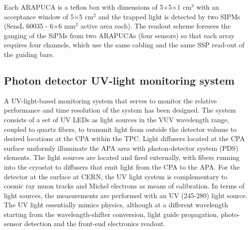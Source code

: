 Each ARAPUCA is a teflon box with dimensions of 5$\times$5$\times$1 cm$^3$ with an acceptance window of 5$\times$5 
cm$^2$ and the trapped light is detected by two SIPMs (SensL 60035 - 6$\times$6 mm$^2$ active area each). The readout scheme foresees the ganging of the SiPMs from two ARAPUCAs (four sensors) so that each array requires four channels, which use the same cabling and the same SSP read-out of the guiding bars.

\subsection{Photon detector UV-light monitoring system}
\label{sec_pd_calib}


A UV-light-based monitoring system that serves to monitor the relative performance and time resolution of the system has been designed. %
The system consists of a set of UV LEDs as light sources in the VUV wavelength range, coupled to quartz fibers, to transmit light from outside the detector volume to desired locations at the CPA within the TPC.
Light diffusers located at the CPA surface uniformly illuminate the APA area with photon-detector system (PDS) elements.
The light sources are located and fired externally, with fibers running into the cryostat to diffusers that emit light from the CPA to the APA. 
For the detector %
at the surface at CERN, the UV light system is complementary to cosmic ray muon 
tracks and Michel electrons as means of calibration. In terms of light sources, the measurements are performed with an UV (245-280) light source.
The UV light essentially mimics physics, although at a different wavelength starting from the wavelength-shifter conversion, 
light guide propagation, photo-sensor detection and the front-end electronics readout.
	
